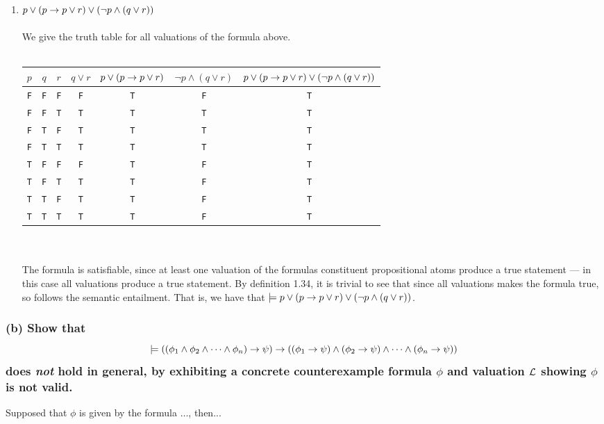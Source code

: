 \begin{enumerate}[i]
	\item
	{
	$p \lor (p \to p \lor r) \lor (\neg p \land (q \lor r))$ \\\\
	We give the truth table for all valuations of the formula above. \\\\
	\begin{tabular}{cccccc|c}
		$p$ & $q$ & $r$ &
		$q \lor r$ &
		$p \lor (p \to p \lor r)$ &
		$\neg p \land (q \lor r)$ &
		$p \lor (p \to p \lor r) \lor (\neg p \land (q \lor r))$ \\ \hline
		{\tt F} & {\tt F} & {\tt F} & {\tt F} & {\tt T} & {\tt F} & {\tt T} \\
		{\tt F} & {\tt F} & {\tt T} & {\tt T} & {\tt T} & {\tt T} & {\tt T} \\
		{\tt F} & {\tt T} & {\tt F} & {\tt T} & {\tt T} & {\tt T} & {\tt T} \\
		{\tt F} & {\tt T} & {\tt T} & {\tt T} & {\tt T} & {\tt T} & {\tt T} \\
		{\tt T} & {\tt F} & {\tt F} & {\tt F} & {\tt T} & {\tt F} & {\tt T} \\
		{\tt T} & {\tt F} & {\tt T} & {\tt T} & {\tt T} & {\tt F} & {\tt T} \\
		{\tt T} & {\tt T} & {\tt F} & {\tt T} & {\tt T} & {\tt F} & {\tt T} \\
		{\tt T} & {\tt T} & {\tt T} & {\tt T} & {\tt T} & {\tt F} & {\tt T} \\
	\end{tabular} \\\\
	The formula is satisfiable, since at least one valuation of the formulas
	constituent propositional atoms produce a true statement --- in this case
	all valuations produce a true statement. By definition 1.34\cite{HR}, it
	is trivial to see that since all valuations makes the formula true, so
	follows the semantic entailment. That is, we have that $\models p \lor
	(p \to p \lor r) \lor (\neg p \land (q \lor r))$.
	}
\end{enumerate}

\subsubsection*{(b) \mdseries Show that \[\models \left((\phi_1 \land \phi_2
\land \dots \land \phi_n) \to \psi \right) \to \left( (\phi_1 \to \psi)
\land (\phi_2 \to \psi) \land \dots \land (\phi_n \to \psi) \right)\] does
{\it not} hold in general, by exhibiting a concrete counterexample formula
$\phi$ and valuation $\cal L$ showing $\phi$ is not valid.} 
Supposed that $\phi$ is given by the formula $\dots$, then...

